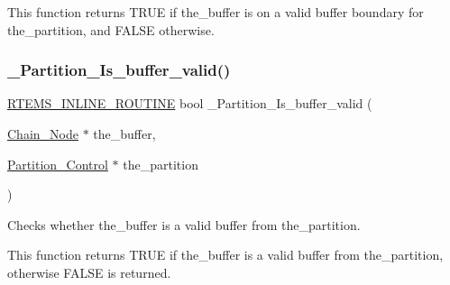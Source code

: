 This function returns T\+R\+UE if the\+\_\+buffer is on a valid buffer boundary for the\+\_\+partition, and F\+A\+L\+SE otherwise. \mbox{\label{group__ClassicPartImpl_ga9fc3a1c2d40c73f16df3fd6a6be9c43f}} 
\subsubsection{\texorpdfstring{\_Partition\_Is\_buffer\_valid()}{\_Partition\_Is\_buffer\_valid()}}
{\footnotesize\ttfamily \mbox{\hyperlink{group__RTEMSScoreBaseDefs_gac216239df231d5dbd15e3520b0b9313f}{R\+T\+E\+M\+S\+\_\+\+I\+N\+L\+I\+N\+E\+\_\+\+R\+O\+U\+T\+I\+NE}} bool \+\_\+\+Partition\+\_\+\+Is\+\_\+buffer\+\_\+valid (\begin{DoxyParamCaption}\item[{\mbox{\hyperlink{group__RTEMSScoreChain_ga0dd4bfcca1ac7f90de2842e447846d3d}{Chain\+\_\+\+Node}} $\ast$}]{the\+\_\+buffer,  }\item[{\mbox{\hyperlink{structPartition__Control}{Partition\+\_\+\+Control}} $\ast$}]{the\+\_\+partition }\end{DoxyParamCaption})}



Checks whether the\+\_\+buffer is a valid buffer from the\+\_\+partition. 

This function returns T\+R\+UE if the\+\_\+buffer is a valid buffer from the\+\_\+partition, otherwise F\+A\+L\+SE is returned. 
